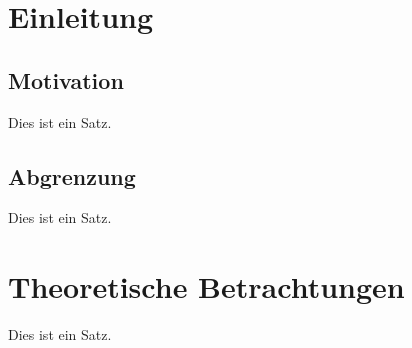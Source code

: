 \documentclass[a4paper, 11pt]{article}
\begin{document}
\tableofcontents

\newpage

\section{Einleitung}

	\subsection{Motivation}

	Dies ist ein Satz.

	\subsection{Abgrenzung}

	Dies ist ein Satz.

	\newpage

\section{Theoretische Betrachtungen}

Dies ist ein Satz.

\end{document}
